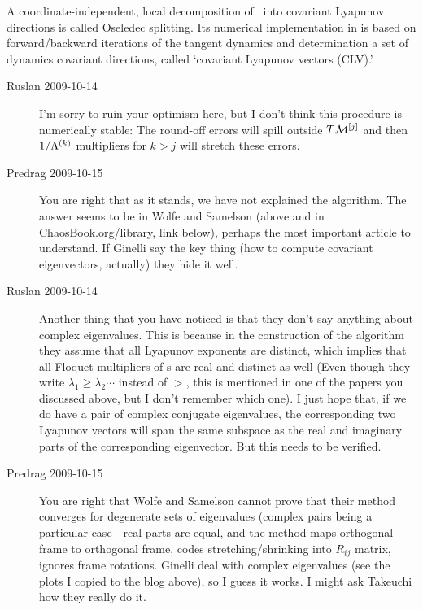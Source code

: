 A coordinate-independent, local decomposition of \statesp\
into covariant Lyapunov directions is called Oseledec
splitting.
Its numerical implementation in 
is based on forward/backward
iterations of the tangent dynamics and determination
a set of dynamics covariant directions,
called `covariant Lyapunov vectors (CLV).'

\begin{description}
  \item[Ruslan 2009-10-14] I'm sorry to ruin your optimism
      here, but I don't think this procedure is numerically
      stable: The round-off errors will spill outside
      $T{\cal M}^{[j]}$ and then $1/\Lambda^{(k)}$ multipliers
      for $k > j$ will stretch these errors.

\item[Predrag 2009-10-15]
You are right that as it stands, we have not explained the
algorithm. The answer seems to be in Wolfe and
Samelson (above and in ChaosBook.org/library, link
below), perhaps the most important article to understand.
If Ginelli \etal{} say the key thing (how
to compute covariant eigenvectors, actually) they hide it
well.

  \item[Ruslan 2009-10-14]
Another thing that you have noticed is that they don't say
anything about complex eigenvalues.  This is because in the
construction of the algorithm they assume that all Lyapunov
exponents are distinct, which implies that all Floquet
multipliers of {\po s} are real and distinct as well
(Even though they write $\lambda_1 \geq \lambda_2 \cdots$
instead of $>$, this is mentioned in one of the papers you
discussed above, but I don't remember which one).  I just
hope that, if we do have a pair of complex conjugate
eigenvalues, the corresponding two Lyapunov vectors will span
the same subspace as the real and imaginary parts of the
corresponding eigenvector.  But this needs to be verified.

\item[Predrag 2009-10-15]
You are right that Wolfe and Samelson cannot prove
that their method converges for degenerate sets of eigenvalues
(complex pairs being a particular case - real parts are
equal, and the method maps orthogonal frame to orthogonal
frame, codes stretching/shrinking into $R_{ij}$ matrix,
ignores frame rotations. Ginelli \etal{}
deal with complex eigenvalues (see the plots I copied to the
blog above), so I guess it works. I might ask Takeuchi how
they really do it.


\end{description}
